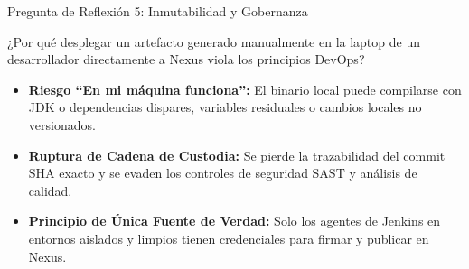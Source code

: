 \documentclass[aspectratio=169]{beamer}
\begin{document}
\begin{frame}{Pregunta de Reflexión 5: Inmutabilidad y Gobernanza}
  \begin{tcolorbox}[colback=cbBlue!8,colframe=cbBlue,arc=4pt,title=\textbf{Pregunta 5: Nexus y la Inmutabilidad de Artefactos},coltitle=cbWhite,fonttitle=\bfseries\small,top=4pt,bottom=4pt,left=6pt,right=6pt]
    \small ¿Por qué desplegar un artefacto generado manualmente en la laptop de un desarrollador directamente a Nexus viola los principios DevOps?
  \end{tcolorbox}
  \vspace{0.2cm}
  \pause
  \begin{tcolorbox}[colback=cbGreen!10,colframe=cbGreen,arc=4pt,title=\textbf{Análisis y Respuesta de Ingeniería},coltitle=cbWhite,fonttitle=\bfseries\small,top=4pt,bottom=4pt,left=6pt,right=6pt]
    \footnotesize
    \begin{itemize}
      \setlength{\itemsep}{1.5pt}
      \item \textbf{Riesgo ``En mi máquina funciona'':} El binario local puede compilarse con JDK o dependencias dispares, variables residuales o cambios locales no versionados.
      \item \textbf{Ruptura de Cadena de Custodia:} Se pierde la trazabilidad del commit SHA exacto y se evaden los controles de seguridad SAST y análisis de calidad.
      \item \textbf{Principio de Única Fuente de Verdad:} Solo los agentes de Jenkins en entornos aislados y limpios tienen credenciales para firmar y publicar en Nexus.
    \end{itemize}
  \end{tcolorbox}
\end{frame}
\end{document}
